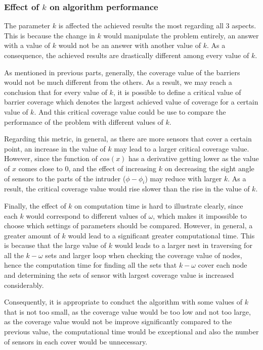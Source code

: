 \subsubsection{Effect of $k$ on algorithm performance}

The parameter $k$ is affected the achieved results the most regarding all 3 aspects. This is because the change in $k$ would manipulate the problem entirely, an answer with a value of $k$ would not be an answer with another value of $k$. As a consequence, the achieved results are drastically different among every value of $k$.

As mentioned in previous parts, generally, the coverage value of the barriers would not be much different from the others. As a result, we may reach a conclusion that for every value of $k$, it is possible to define a critical value of barrier coverage which denotes the largest achieved value of coverage for a certain value of $k$. And this critical coverage value could be use to compare the performance of the problem with different values of $k$.

Regarding this metric, in general, as there are more sensors that cover a certain point, an increase in the value of $k$ may lead to a larger critical coverage value. However, since the function of $cos(x)$ has a derivative getting lower as the value of $x$ comes close to 0, and the effect of increasing $k$ on decreasing the sight angle of sensors to the parts of the intruder ($\phi - \phi_i$) may reduce with larger $k$. As a result, the critical coverage value would rise slower than the rise in the value of $k$.

Finally, the effect of $k$ on computation time is hard to illustrate clearly, since each $k$ would correspond to different values of $\omega$, which makes it impossible to choose which settings of parameters should be compared. However, in general, a greater amount of $k$ would lead to a significant greater computational time. This is because that the large value of $k$ would leads to a larger nest in traversing for all the $k-\omega$ sets and larger loop when checking the coverage value of nodes, hence the computation time for finding all the sets that $k-\omega$ cover each node and determining the sets of sensor with largest coverage value is increased considerably.

Consequently, it is appropriate to conduct the algorithm with some values of $k$ that is not too small, as the coverage value would be too low and not too large, as the coverage value would not be improve significantly compared to the previous value, the computational time would be exceptional and also the number of sensors in each cover would be unnecessary.

